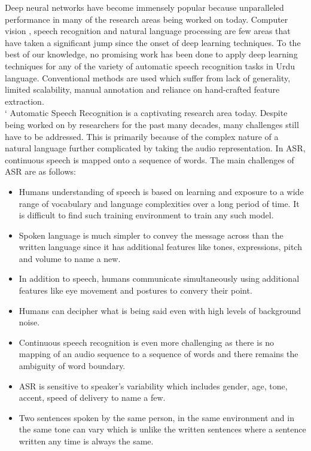 \documentclass[conference]{IEEEtran}
\begin{document}
Deep neural networks have become immensely popular because unparalleled performance in many of the research areas being worked on today. Computer vision \cite{goodfellow2016deep}, speech recognition \cite{deng2013new} and natural language processing \cite{young2018recent} are few areas that have taken a significant jump since the onset of deep learning techniques. To the best of our knowledge, no promising work has been done to apply deep learning techniques for any of the variety of automatic speech recognition tasks in Urdu language. Conventional methods are used which suffer from lack of generality, limited scalability, manual annotation and reliance on hand-crafted feature extraction. \\
`
Automatic Speech Recognition is a captivating research area today. Despite being worked on by researchers for the past many decades, many challenges still have to be addressed. This is primarily because of the complex nature of a natural language further complicated by taking the audio representation. In ASR, continuous speech is mapped onto a sequence of words. The main challenges of ASR are as follows:
\begin{itemize}
  \item Humans understanding of speech is based on learning and exposure to a wide range of vocabulary and language complexities over a long period of time. It is difficult to find such training environment to train any such model.
	\item Spoken language is much simpler to convey the message across than the written language since it has additional features like tones, expressions, pitch and volume to name a new.
	\item In addition to speech, humans communicate simultaneously using additional features like eye movement and postures to convery their point.
	\item Humans can decipher what is being said even with high levels of background noise.	
	\item Continuous speech recognition is even more challenging as there is no mapping of an audio sequence to a sequence of words and there remains the ambiguity of word boundary.
	\item ASR is sensitive to speaker's variability  which includes gender, age, tone, accent, speed of delivery to name a few.
	\item Two sentences spoken by the same person, in the same environment and in the same tone can vary which is unlike the written sentences where a sentence written any time is always the same.
\end{itemize}  
 
\end{document}
